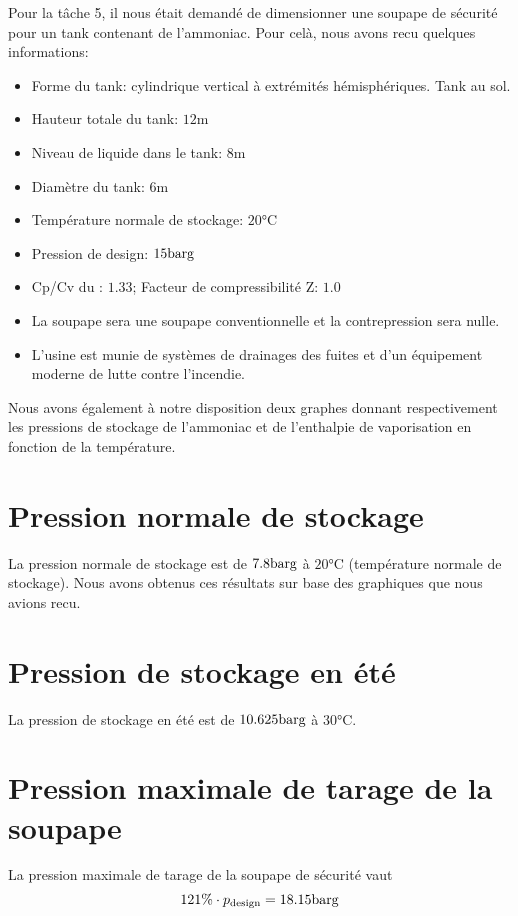 Pour la t\^ache 5, il nous était demandé de dimensionner une soupape de sécurité
pour un tank contenant de l'ammoniac. Pour celà, nous avons recu quelques informations:

\begin{itemize}

\item Forme du tank: cylindrique vertical à extrémités hémisphériques. Tank au sol.
\item Hauteur totale du tank: $12 \si{\metre}$
\item Niveau de  liquide dans le tank: $8\si{\metre}$
\item Diamètre du tank: $6 \si{\metre}$
\item Température normale de stockage: $20 \si{\degreeCelsius}$
\item Pression de design: $15 \si{\bar}\text{g}$
\item Cp/Cv du : $1.33$; Facteur de compressibilité Z: $1.0$
\item La soupape sera une soupape conventionnelle et la contrepression sera nulle.
\item L’usine est munie de systèmes de drainages des fuites 
	et d’un équipement moderne de lutte contre l’incendie.
\end{itemize}

Nous avons également à notre disposition deux graphes donnant respectivement 
les pressions de stockage de l'ammoniac et de l'enthalpie de vaporisation 
en fonction de la température. 

\section{Pression normale de stockage} 
La pression normale de stockage est de $7.8 \si{\bar}\text{g}$ à $20\si{\celsius}$ 
(température normale de stockage). Nous avons obtenus ces résultats sur base des
graphiques que nous avions recu.

\section{Pression de stockage en été} 
La pression de stockage en été est de $10.625 \si{\bar}\text{g}$ à $30\si{\celsius}$.

\section{Pression maximale de tarage de la soupape} 
La pression maximale de tarage de la soupape de sécurité vaut 
\[ 121\% \cdot p_{\text{design}} = 18.15 \si{\bar}\text{g} \]


